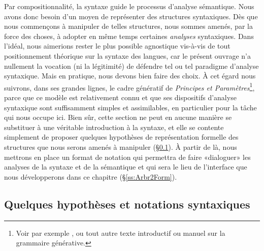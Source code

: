 Par compositionnalité, la syntaxe guide le processus d'analyse sémantique.
Nous avons donc besoin d'un moyen de représenter des structures syntaxiques.
Dès que nous commençons à manipuler de telles structures, nous sommes amenés, par la force des choses, à adopter en même temps certaines \emph{analyses} syntaxiques. 
Dans l'idéal, nous aimerions rester le plus possible agnostique vis-à-vis de tout positionnement théorique sur la syntaxe des langues,
car  le présent ouvrage n'a nullement la vocation (ni la légitimité) de défendre tel ou tel paradigme d'analyse syntaxique. 
Mais en pratique, nous devons bien faire des choix.
À cet égard nous suivrons, dans ses grandes lignes, le cadre génératif de \emph{Principes et Paramètres}\footnote{Voir par exemple \citet{Chom:81}, ou tout autre texte introductif ou manuel sur la grammaire générative.}, parce que ce modèle est relativement connu et que ses dispositifs d'analyse syntaxique sont suffisamment simples et assimilables, en particulier pour la tâche qui nous occupe ici. 
Bien sûr, cette section ne peut en aucune manière se substituer à une véritable introduction à la syntaxe, et elle se contente simplement de proposer  quelques hypothèses de représentation formelle des structures que nous serons amenés à manipuler (\S\ref{ss:HypSynt}).  À partir de là, nous mettrons en place un format de notation qui permettra de faire «dialoguer» les analyses de la syntaxe et de la sémantique et qui sera le lieu de l'interface que nous développerons dans ce chapitre
(\S\ref{ss:Arbr2Form}).


\subsection{Quelques hypothèses et notations syntaxiques}
\label{ss:HypSynt}

